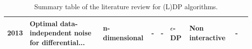 \begin{landscape}
\begin{table}[ht]
\begin{adjustbox}{width=1.6\textwidth}
\begin{tabular}{rllllllll}
        2013 \citep{geng_optimal_2013}      & Optimal data-independent noise for differential... & n-dimensional                                      & -       & -                                                  & $\epsilon$-DP  & Non interactive             & -                                      \\
        \bottomrule
      \end{tabular}
    \end{adjustbox}
    \caption{Summary table of the literature review for (L)DP algorithms.}
    \label{tab:summary_table_dp}
  \end{table}
\end{landscape}

